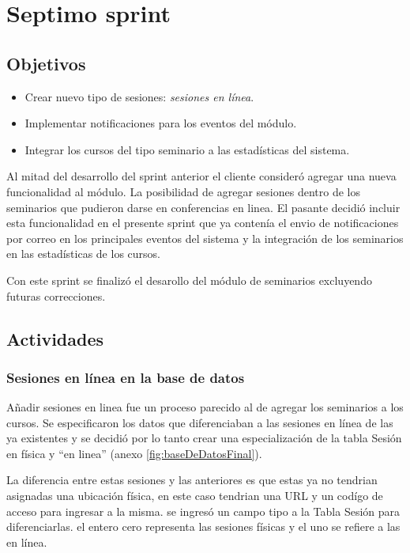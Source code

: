 \section{Septimo sprint} %
\label{sec:septimo_sprint}

\subsection{Objetivos}

\begin{itemize}
	\item Crear nuevo tipo de sesiones: \emph{sesiones en línea}.
	\item Implementar notificaciones para los eventos del módulo.
	\item Integrar los cursos del tipo seminario a las estadísticas del sistema.
\end{itemize}

Al mitad del desarrollo del sprint anterior el cliente consideró agregar una nueva funcionalidad al módulo. La posibilidad de agregar sesiones dentro de los seminarios que pudieron darse en conferencias en linea. El pasante decidió incluir esta funcionalidad en el presente sprint que ya contenía el envio de notificaciones por correo en los principales eventos del sistema y la integración de los seminarios en las estadísticas de los cursos.

Con este sprint se finalizó el desarollo del módulo de seminarios excluyendo futuras correcciones.

\subsection{Actividades} %
\label{sub:actividades7}

\subsubsection{Sesiones en línea en la base de datos}

Añadir sesiones en linea fue un proceso parecido al de agregar los seminarios a los cursos. Se especificaron los datos que diferenciaban a las sesiones en línea de las ya existentes y se decidió por lo tanto crear una especialización de la tabla Sesión en física y ``en linea'' (anexo \ref{fig:baseDeDatosFinal}).

La diferencia entre estas sesiones y las anteriores es que estas ya no tendrian asignadas una ubicación física, en este caso tendrian una URL y un codígo de acceso para ingresar a la misma. se ingresó un campo tipo a la Tabla Sesión para diferenciarlas. el entero cero representa las sesiones físicas y el uno se refiere a las en línea.

